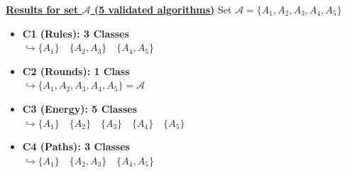 \begin{frame}{}

\vspace{0.2cm}
\href{https://luminousrobots.github.io/RoASt-exec1-classes/global_classification.html}{\textcolor{accent}{\textbf{Results for set $\mathcal{A}$ (5 validated algorithms)}}}
\newline \textcolor{softgray}{\scriptsize Set $\mathcal{A} = \{A_1, A_2, A_3, A_4, A_5\}$}
\vspace{0.4cm}

\begin{itemize}\setlength\itemsep{0.3cm}
    \item<1-> \textbf{C1 (Rules): 3 Classes}\\
              \textcolor{accent}{\scriptsize $\hookrightarrow \{A_1\} \quad \{A_2, A_3\} \quad \{A_4, A_5\}$}
              
    \item<2-> \textbf{C2 (Rounds): 1 Class}\\
              \textcolor{accent}{\scriptsize $\hookrightarrow \{A_1, A_2, A_3, A_4, A_5\} = \mathcal{A}$}
              
    \item<3-> \textbf{C3 (Energy): 5 Classes}\\
              \textcolor{accent}{\scriptsize $\hookrightarrow \{A_1\} \quad \{A_2\} \quad \{A_3\} \quad \{A_4\} \quad \{A_5\}$}
              
    \item<4-> \textbf{C4 (Paths): 3 Classes}\\
              \textcolor{accent}{\scriptsize $\hookrightarrow \{A_1\} \quad \{A_2, A_3\} \quad \{A_4, A_5\}$}
\end{itemize}

\vfill

\end{frame}